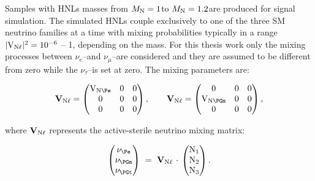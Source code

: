 Samples with HNLs masses from 
$M_{\mathrm{N}} = 1$\GeV to $M_{\mathrm{N}} = 1.2$\TeV are produced for signal simulation. The simulated HNLs couple
exclusively to one of the three SM neutrino families at a time with 
mixing probabilities typically in a range $\mathrm{|V_{\mathrm{N}\ell}|^2} = 10^{-6}$ -- 1,
depending on the mass. For this thesis work only the mixing processes between
$\nu_e$--\hnl and $\nu_{\mu}$--\hnl are considered and they are
assumed to be different from zero while the
$\nu_{\tau}$--\hnl is set at zero. The mixing parameters are:
\begin{linenomath}
\begin{equation}
  \mathbf{V}_{\hnl\ell} =
  \begin{pmatrix}
    \mathrm{V}_{\hnl\Pe} & 0 & 0 \\
    0                   & 0 & 0 \\
    0                   & 0 & 0 \\
  \end{pmatrix},
\quad\quad
  \mathbf{V}_{\hnl\ell} =
  \begin{pmatrix}
    0                    & 0 & 0 \\
    \mathrm{V}_{\hnl\PGm} & 0 & 0 \\
    0                    & 0 & 0 \\
  \end{pmatrix},
\end{equation}
\end{linenomath}
where $\mathbf{V}_{\mathrm{N}\ell}$ represents the active-sterile neutrino
mixing matrix:
\begin{linenomath}
\begin{equation}
  \begin{pmatrix}
    \nu_{\Pe}  \\
    \nu_{\PGm} \\
    \nu_{\PGt} \\
  \end{pmatrix} ~=~
  \mathbf{V}_{\hnl\ell}\,\cdot\,
  \begin{pmatrix}
    \hnl_{1} \\
    \hnl_{2} \\
    \hnl_{3} \\
  \end{pmatrix}.
\end{equation}
\end{linenomath}

